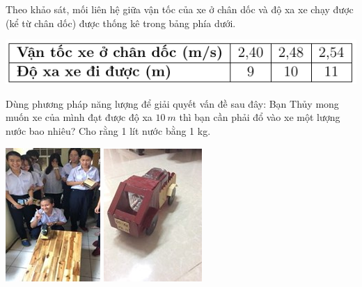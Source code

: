 \begin{enumerate}[label=\bfseries Câu \arabic*:]
{\begin{minipage}[l]{0.7\textwidth}
\begin{enumerate}[label=\alph*)]
			Theo khảo sát, mối liên hệ giữa vận tốc của xe ở chân dốc và độ xa xe chạy được (kể từ chân dốc) được thống kê trong bảng phía dưới.
			\begin{center}
				\includegraphics{../figs/VN10-2021-PH-TP027-7}
			\end{center}
			Dùng phương pháp năng lượng để giải quyết vấn đề sau đây: Bạn Thủy mong muốn xe của mình đạt được độ xa $\SI{10}{m}$ thì bạn cần phải đổ vào xe một lượng nước bao nhiêu? Cho rằng 1 lít nước bằng 1 kg.
		\end{enumerate}
	\end{minipage}
	\begin{minipage}[r]{0.3\textwidth}
		\includegraphics{../figs/VN10-2021-PH-TP027-2}
		\includegraphics[scale=0.97]{../figs/VN10-2021-PH-TP027-6}
	\end{minipage}
}
\end{enumerate}
